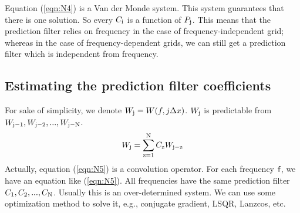 Equation (\ref{eqn:N4}) is a Van der Monde system. This system guarantees that 
there is one solution. So every $C_{\rm i}$ is a function of $P_{\rm j}$. 
This means that the prediction filter relies on frequency in the case of 
frequency-independent grid; whereas in the case of frequency-dependent 
grids, we can still get a prediction filter which is independent from 
frequency.
\subsection{Estimating the prediction filter coefficients}
\par
For sake of simplicity, we denote $W_{\rm j}=W(f,j\Delta x)$. $W_{\rm j}$ is 
predictable from $W_{\rm j-1}, W_{\rm j-2},..., W_{\rm j-N}$. 
\begin{equation}
	W_{\rm j}=\sum_{\rm z=1}^{\rm N}C_{\rm z}W_{\rm j-z}
\label{eqn:N5}
\end{equation}
Actually, equation (\ref{eqn:N5}) is a convolution operator. For each frequency
{\tt f}, we have an equation like (\ref{eqn:N5}). 
All frequencies have the same prediction filter $C_1, C_2,..., C_{\rm N}$. 
Usually this is an over-determined system. We can use some optimization 
method to solve it, e.g., conjugate gradient, LSQR, Lanzcos, etc. 

